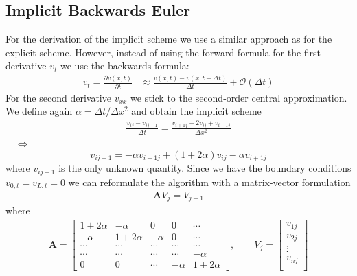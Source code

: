 \documentclass[%
 reprint,
nofootinbib,
aps,
]{revtex4-1}
\renewcommand{\vec}[1]{\mathbf{#1}} %
\begin{document}
\subsection{Implicit Backwards Euler}
For the derivation of the implicit scheme we use a similar approach as for the explicit scheme. However, instead of using the forward formula for the first derivative $v_t$ we use the backwards formula:
\begin{align*}
     v_t = \frac{\partial v(x,t)}{\partial t} &\approx \frac{v(x,t) - v(x,t - \Delta t)}{\Delta t} + \mathcal{O}(\Delta t)
\end{align*}
For the second derivative $v_{xx}$ we stick to the second-order central approximation.
We define again $\alpha = \Delta t/\Delta x^2$ and obtain the implicit scheme
\begin{align*}
    \frac{v_{ij} - v_{ij-1}}{\Delta t} = \frac{v_{i+1j} -2v_{ij} + v_{i-1j}}{\Delta x^2}
\end{align*}
$\quad \Longleftrightarrow$
\begin{equation}
    v_{ij-1} = -\alpha v_{i-1j} + (1+2\alpha)v_{ij} - \alpha v_{i+1j}
    \label{eq:implicit}
\end{equation}
where $v_{ij-1}$ is the only unknown quantity. Since we have the boundary conditions $v_{0,t} = v_{L,t} = 0$ we can reformulate the algorithm with a matrix-vector formulation
\begin{align}\label{eq:Immatrix}
    \vec{A}V_j = V_{j-1}
\end{align}
where
\begin{align}
    \vec{A} = \begin{bmatrix}
                    1+2\alpha & -\alpha & 0 & 0 & \cdots \\
                    -\alpha & 1+2\alpha & -\alpha & 0 & \cdots \\
                    \cdots & \cdots & \cdots & \cdots & \cdots \\
                    \cdots & \cdots & \cdots & \cdots & -\alpha \\
                    0 & 0 & \cdots & -\alpha & 1+2\alpha
    \end{bmatrix}
     , \qquad V_j =  \begin{bmatrix}
                        v_{1j} \\
                        v_{2j} \\
                        \vdots \\
                        v_{nj} \\
                    \end{bmatrix}
    \label{eq:A_Im}
\end{align}
\end{document}
